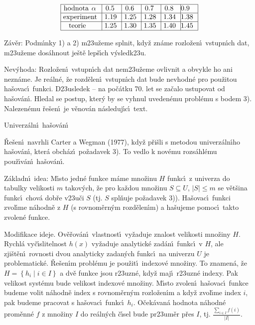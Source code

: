 $$\vtop{\offinterlineskip\halign {\strut\vrule\ # & \vrule\ # & \vrule\ # & \vrule\ # & \vrule\ # & \vrule \hfil # \hfil \vrule\cr\noalign{\hrule}hodnota $\alpha$ & 0.5 & 0.6 & 0.7 & 0.8 & 0.9 \hfill \cr\noalign{\hrule}experiment & 1.19 & 1.25 & 1.28 & 1.34 & 1.38 \cr\noalign{\hrule}teorie & 1.25 & 1.30 & 1.35 & 1.40 & 1.45 \cr\noalign{\hrule}}}$$
\medskip

\flushpar Z\'av\v er: Podm\'\i nky 1) a 2) m\accent23u\v zeme splnit, 
kdy\v z zn\'ame rozlo\v zen\'\i\ vstupn\'\i ch dat, m\accent23u\v zeme 
dos\'ahnout je\v st\v e lep\v s\'\i ch v\'ysledk\accent23u.
\medskip

\flushpar Nev\'yhoda: Rozlo\v zen\'\i\ vstupn\'\i ch dat 
nem\accent23u\v zeme ovlivnit a obvykle ho ani nezn\'ame. Je 
re\'aln\'e, \v ze rozd\v elen\'\i\ vstupn\'\i ch dat bude nevhodn\'e pro 
pou\v zitou ha\v sovac\'\i\ funkci. D\accent23usledek -- na po\v c\'atku 
70. let se za\v calo ustupovat od ha\v sov\'an\'\i . Hledal se postup, 
kter\'y by se vyhnul uveden\'emu probl\'emu s bodem 3). Nalezen\'emu 
\v re\v sen\'\i\ je v\v enov\'an n\'asleduj\'\i c\'\i\ text.
\medskip


\heading
Univerz\'aln\'\i\ ha\v sov\'an\'\i
\endheading

\flushpar\v Re\v sen\'\i\ navrhli Carter a Wegman (1977), kdy\v z p\v ri\v sli s 
metodou univerz\'aln\'\i ho ha\v sov\'an\'\i , kter\'a obch\'az\'\i\ po\v za\-davek 3).  
To vedlo k nov\'emu rozs\'ahl\'emu pou\v z\'\i v\'an\'\i\ ha\v sov\'an\'\i .  
\medskip

\flushpar Z\'akladn\'\i\ idea: M\'\i sto jedn\'e funkce m\'ame 
mno\v zinu $H$ funkc\'\i\ z univerza do tabulky velikosti $m$ 
takov\'ych, \v ze pro ka\v zdou mno\v zinu $S\subseteq U$, $|S|\le 
m$ se 
v\v et\v sina funkc\'\i\ chov\'a dob\v re v\accent23u\v ci $S$ (tj. $
S$ 
spl\v nuje po\v zadavek 3)). Ha\v sovac\'\i\ funkci 
zvol\'\i me n\'ahodn\v e z $H$ (s rovnom\v ern\'ym rozd\v elen\'\i m) a ha\v sujeme  
pomoc\'\i\ takto zvo\-len\'e funkce. 
\medskip

\flushpar Modifikace ideje. Ov\v e\v rov\'an\'\i\ vlastnost\'\i\ vy\v zaduje 
znalost velikosti mno\v ziny $H$. Rychl\'a vy\v c\'\i slitelnost $
h\left(x\right)$ 
vy\v zaduje ana\-lytick\'e zad\'an\'\i\ funkc\'\i\ v $H$, ale zji\v st\v en\'\i\ rovnosti 
dvou analy\-ticky zadan\'ych funkc\'\i\ na univerzu $U$ je 
problematick\'e. \v Re\v sen\'\i m probl\'emu je pou\v zit\'\i\ indexov\'e mno\v ziny. 
To znamen\'a, \v ze $H=\left\{h_i\mid i\in I\right\}$ a dv\v e funkce jsou r\accent23uzn\'e, 
kdy\v z maj\'\i\ r\accent23uzn\'e indexy. Pak velikost syst\'emu bude 
velikost indexov\'e mno\v ziny. M\'\i sto zvolen\'\i\ ha\v sovac\'\i\ funkce 
budeme volit n\'ahodn\v e index s rovnom\v ern\'ym rozlo\v zen\'\i m a kdy\v z 
zvol\'\i me index $i$, pak budeme pracovat s ha\v sovac\'\i\ funkc\'\i\ $
h_i$. 
O\v cek\'avan\'a hodnota n\'ahodn\'e prom\v enn\'e $f$ z mno\v ziny $
I$ do 
re\'aln\'ych \v c\'\i sel bude pr\accent23um\v er p\v res $I$, tj. $\frac {
\sum_{i\in I}f\left(i\right)}{|I|}$.

